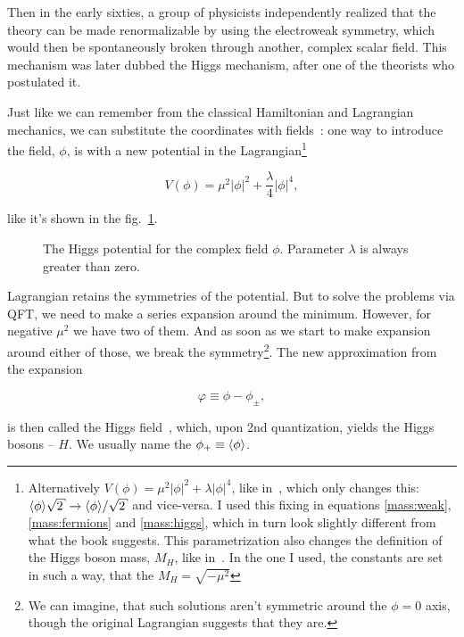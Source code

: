 Then in the early sixties, a group of physicists independently realized that the theory can be made renormalizable by using the
electroweak symmetry, which would then be spontaneously broken through another, complex scalar field. This mechanism was later dubbed
the Higgs mechanism, after one of the theorists who postulated it.

Just like we can remember from the classical Hamiltonian and Lagrangian mechanics, we can substitute the coordinates with
fields~\cite{peskin}: one way to introduce the field, $\phi$, is with a new potential in the Lagrangian\footnote{Alternatively
$V(\phi) = \mu^2|\phi|^2 + \lambda|\phi|^4$, like in~\cite[pg. 18]{elena:green}, which only changes this: $\vac\sqrt{2}
\to \vac/\sqrt{2}$ and vice-versa. I used this fixing in equations \eqref{mass:weak}, \eqref{mass:fermions} and
\eqref{mass:higgs}, which in turn look slightly different from what the book suggests. This parametrization also changes the
definition of the Higgs boson mass, $M_H$, like in~\cite[pg. 267]{perkins}. In the one I used, the constants are set in such a way,
that the $M_H = \sqrt{-\mu^2}$}~\cite{perkins,peskin,elena:green}

\begin{equation}
	V(\phi) = \mu^2|\phi|^2 + \frac{\lambda}{4}|\phi|^4, \label{potential}
\end{equation}

like it's shown in the fig.~\ref{higgsf}.

\begin{figure}[H]
	\centering
	
	\caption{The Higgs potential for the complex field $\phi$. Parameter $\lambda$ is always greater than zero.}
	\label{higgsf}
\end{figure}

Lagrangian retains the symmetries of the potential. But to solve the problems via QFT, we need to make a series expansion around
the minimum. However, for negative $\mu^2$ we have two of them. And as soon as we start to make expansion around either of
those, we break the symmetry\footnote{We can imagine, that such solutions aren't symmetric around the $\phi = 0$ axis, though
the original Lagrangian suggests that they are.}. The new approximation from the expansion

\[
	\varphi \equiv \phi - \phi_\pm,
\]

is then called the Higgs field~\cite{wikipedia}, which, upon 2nd quantization, yields the Higgs bosons -- $H$. We usually
name the $\phi_+ \equiv \langle\phi\rangle$.

